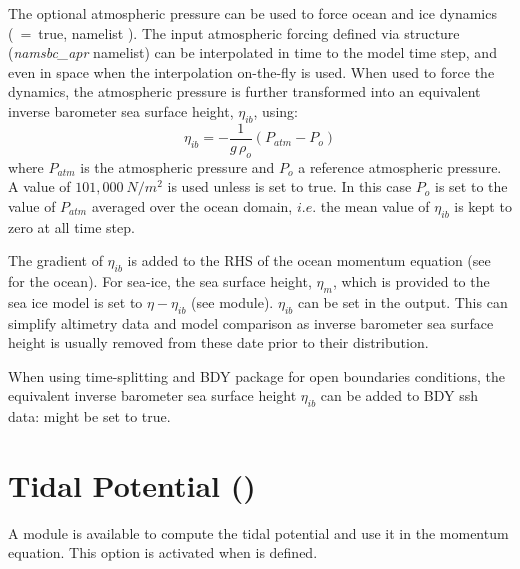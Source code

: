 \documentclass[NEMO_book]{subfiles}
\begin{document}
The optional atmospheric pressure can be used to force ocean and ice dynamics 
(~=~true, \textit{} namelist ).
The input atmospheric forcing defined via  structure (\textit{namsbc\_apr} namelist) 
can be interpolated in time to the model time step, and even in space when the 
interpolation on-the-fly is used. When used to force the dynamics, the atmospheric 
pressure is further transformed into an equivalent inverse barometer sea surface height, 
$\eta_{ib}$, using:
\begin{equation} \label{SBC_ssh_ib}
	\eta_{ib} = -  \frac{1}{g\,\rho_o}  \left( P_{atm} - P_o \right) 
\end{equation}
where $P_{atm}$ is the atmospheric pressure and $P_o$ a reference atmospheric pressure.
A value of $101,000~N/m^2$ is used unless  is set to true. In this case $P_o$ 
is set to the value of $P_{atm}$ averaged over the ocean domain, $i.e.$ the mean value of 
$\eta_{ib}$ is kept to zero at all time step.

The gradient of $\eta_{ib}$ is added to the RHS of the ocean momentum equation 
(see  for the ocean). For sea-ice, the sea surface height, $\eta_m$, 
which is provided to the sea ice model is set to $\eta - \eta_{ib}$ (see  module).
$\eta_{ib}$ can be set in the output. This can simplify altimetry data and model comparison 
as inverse barometer sea surface height is usually removed from these date prior to their distribution.

When using time-splitting and BDY package for open boundaries conditions, the equivalent 
inverse barometer sea surface height $\eta_{ib}$ can be added to BDY ssh data: 
  might be set to true.

\section   [Tidal Potential (\textit{sbctide})]
                        {Tidal Potential ()}
\label{SBC_tide}


A module is available to compute the tidal potential and use it in the momentum equation.
This option is activated when  is defined.
\end{document}
